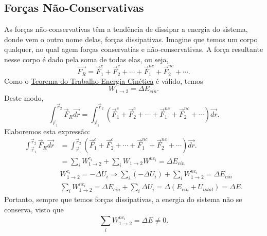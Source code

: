 \documentclass[PhysicsI/physics_notes.tex]{subfiles}
\begin{document}
\subsection{Forças Não-Conservativas}
As forças não-conservativas têm a tendência de dissipar a energia do sistema, donde vem o
outro nome delas, forças dissipativas. Imagine que temos um corpo qualquer, no qual
agem forças conservatias e não-conservativas. A força resultante nesse corpo
é dado pela soma de todas elas, ou seja,
\[
	\vec{F_{R}} = \vec{F}_{1}^{c} + \vec{F}_{2}^{c} + \cdots +\vec{F}_{1}^{nc} + \vec{F}_{2}^{nc} + \cdots.
\]
Como o \hyperlink{kin_en_theo}{Teorema do Trabalho-Energia Cinética} é válido, temos
\[
	W_{1\rightarrow2} = \Delta E_{cin}.
\]
Deste modo,
\[
	\int_{\vec{r}_{1}}^{\vec{r}_{2}}\vec{F}_{R}\vec{dr} = \int_{\vec{r}_{1}}^{\vec{r}_{2}}( \vec{F}_{1}^{c} + \vec{F}_{2}^{c} + \cdots +\vec{F}_{1}^{nc} + \vec{F}_{2}^{nc} + \cdots)\vec{dr}.
\]
Elaboremos esta expressão:
\begin{align*}
	\int_{\vec{r}_{1}}^{\vec{r}_{2}}\vec{F}_{R}\vec{dr} & = \int_{\vec{r}_{1}}^{\vec{r}_{2}}( \vec{F}_{1}^{c} + \vec{F}_{2}^{c} + \cdots +\vec{F}_{1}^{nc} + \vec{F}_{2}^{nc} + \cdots)\vec{dr}.                  \\
	                                                    & = \sum\limits_{i}^{}W_{1\rightarrow2}^{c_{i}} + \sum\limits_{i}^{}W_{1\rightarrow2}W^{nc_{i}} = \Delta E_{cin}                                          \\
	                                                    & W_{1\rightarrow2}^{c_{i}} = -\Delta U_{i} \Rightarrow \sum\limits_{i}^{}(-\Delta U_{i}) + \sum\limits_{i}^{}W_{1\rightarrow2}^{nc_{i}} = \Delta E_{cin} \\
	                                                    & \sum\limits_{i}^{}W_{1\rightarrow2}^{nc_{i}}=\Delta E_{cin}+\sum\limits_{i}^{}\Delta U_{i} = \Delta (E_{cin}+U_{total}) = \Delta E.
\end{align*}
Portanto, sempre que temos forças dissipativas, a energia do sistema não se conserva, visto que
\[
	\sum\limits_{i}^{}W_{1\rightarrow2}^{nc_{i}} = \Delta E\neq 0.
\]
\end{document}
